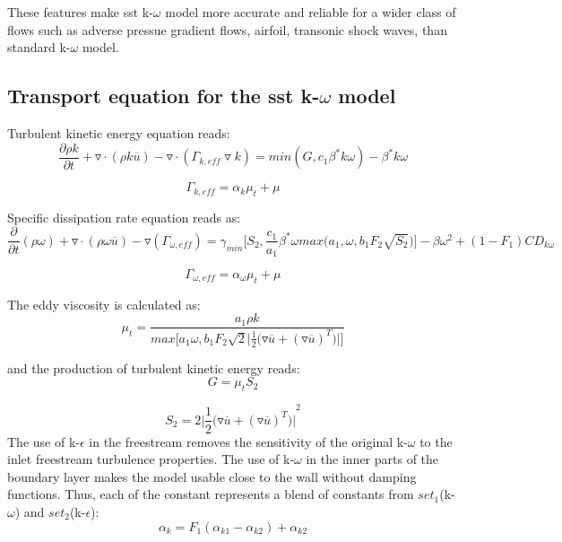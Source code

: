 These features make sst k-$\omega$ model more accurate and reliable
for a wider class of flows such as adverse pressue gradient flows,
airfoil, transonic shock waves, than standard k-$\omega$ model.

\subsection{Transport equation for the sst k-$\omega$ model}
Turbulent kinetic energy equation reads:
\begin{equation}
{{{\frac{\partial {\rho k}}{\partial t}}+{\triangledown \cdot(\rho k
      \overline{u})}}-{\triangledown \cdot
    ({{\Gamma}_{k,eff}}\triangledown{k})}}
   ={min(G,{c_1}{{\beta}^*}k\omega)-{{\beta}^*}k\omega}
\end{equation}

\begin{equation}
{{\Gamma}_{k,eff}}={{{\alpha}_k}{{\mu}_t}}+{\mu}
\end{equation}

Specific dissipation rate equation reads as:
\begin{equation}
{{{\frac{\partial}{\partial t}}(\rho
    \omega)}+{{\triangledown\cdot(\rho \omega
      \overline{u})}}-{\triangledown({{\Gamma}_{\omega,eff}})}} 
    ={{{\gamma}_{min}}\bigg[{S_2},{\frac{c_1}{a_1}}{{\beta}^*}\omega
    max\bigg
    ({a_1},{\omega},{b_1}{F_{2}\sqrt{S_2}\bigg)\bigg]}}
    -{{\beta}{{\omega}^2}+(1-{F_1})CD_{k\omega}}
\end{equation}

\begin{equation}
{{\Gamma}_{\omega,eff}}={{{\alpha}_{\omega}}{{\mu}_t}+{\mu}}
\end{equation}

The eddy viscosity is calculated as:
\begin{equation}
{{\mu}_t}={\frac{{a_1}\rho k}{max\bigg[{a_1}{\omega},
  {b_1}{F_2}\sqrt{2}\bigg\vert{{\frac{1}{2}\bigg({\triangledown \overline{u}}
  +{(\triangledown \overline{u})^{T}}\bigg)\bigg\vert }}\bigg]}}
\end{equation}

and the production of turbulent kinetic energy reads:
\begin{equation}
{G}={{\mu}_t}{S_2}
\end{equation}

\begin{equation}
{S_2}={2\bigg\vert{{\frac{1}{2}\bigg({\triangledown \overline{u}}
  +{(\triangledown \overline{u})^{T}}\bigg)\bigg\vert}^2}}
\end{equation}
The use of k-$\epsilon$ in the freestream removes the sensitivity of
the original k-$\omega$ to the inlet freestream turbulence
properties. The use of k-$\omega$ in the inner parts of the boundary
layer makes the model usable close to the wall without damping
functions. Thus, each of the constant represents a blend of constants
from $set_1$(k-$\omega$) and $set_2$(k-$\epsilon$):
\begin{equation}
{{\alpha}_k}={F_1}({{\alpha}_{k1}}-{{\alpha}_{k2}})+{{\alpha}_{k2}}
\end{equation}

